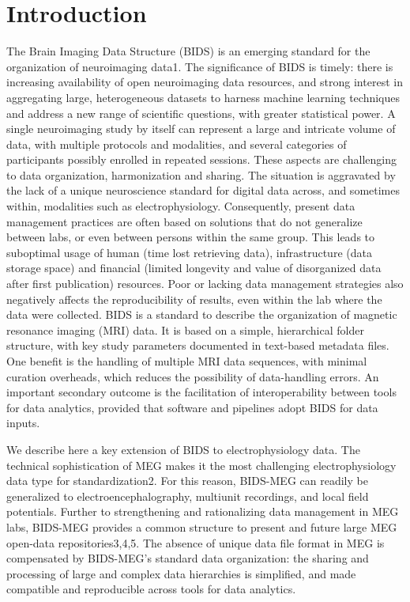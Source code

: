 \section{Introduction}
The Brain Imaging Data Structure (BIDS) is an emerging standard for the organization of neuroimaging data1. The significance of BIDS is timely: there is increasing availability of open neuroimaging data resources, and strong interest in aggregating large, heterogeneous datasets to harness machine learning techniques and address a new range of scientific questions, with greater statistical power. A single neuroimaging study by itself can represent a large and intricate volume of data, with multiple protocols and modalities, and several categories of participants possibly enrolled in repeated sessions. These aspects are challenging to data organization, harmonization and sharing. The situation is aggravated by the lack of a unique neuroscience standard for digital data across, and sometimes within, modalities such as electrophysiology. Consequently, present data management practices are often based on solutions that do not generalize between labs, or even between persons within the same group. This leads to suboptimal usage of human (time lost retrieving data), infrastructure (data storage space) and financial (limited longevity and value of disorganized data after first publication) resources. Poor or lacking data management strategies also negatively affects the reproducibility of results, even within the lab where the data were collected. 
BIDS is a standard to describe the organization of magnetic resonance imaging (MRI) data. It is based on a simple, hierarchical folder structure, with key study parameters documented in text-based metadata files. One benefit is the handling of multiple MRI data sequences, with minimal curation overheads, which reduces the possibility of data-handling errors. An important secondary outcome is the facilitation of interoperability between tools for data analytics, provided that software and pipelines adopt BIDS for data inputs. 

We describe here a key extension of BIDS to electrophysiology data. The technical sophistication of MEG makes it the most challenging electrophysiology data type for standardization2. For this reason, BIDS-MEG can readily be generalized to electroencephalography, multiunit recordings, and local field potentials. Further to strengthening and rationalizing data management in MEG labs, BIDS-MEG provides a common structure to present and future large MEG open-data repositories3,4,5. The absence of unique data file format in MEG is compensated by BIDS-MEG’s standard data organization: the sharing and processing of large and complex data hierarchies is simplified, and made compatible and reproducible across tools for data analytics. 

